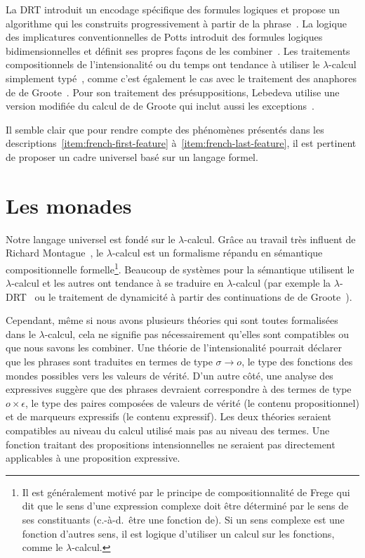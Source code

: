 La DRT introduit un encodage spécifique des formules logiques et propose un
algorithme qui les construits progressivement à partir de la phrase~\cite{kamp1993discourse}. La logique des implicatures conventionnelles de
Potts introduit des formules logiques bidimensionnelles et définit ses propres
façons de les combiner~\cite{potts2005logic}. Les traitements compositionnels
de l'intensionalité ou du temps ont tendance à utiliser le $\lambda$-calcul
simplement typé~\cite{ben2007semantics,de2013note}, comme c'est également le cas
avec le traitement des anaphores de de Groote~\cite{de2006towards}. Pour son traitement
des présuppositions, Lebedeva utilise une version modifiée du calcul de de Groote
qui inclut aussi les exceptions~\cite{lebedeva2012expression}.

Il semble clair que pour rendre compte des phénomènes présentés dans les descriptions~\ref{item:french-first-feature} à~\ref{item:french-last-feature}, il est pertinent de proposer un cadre universel basé sur un langage formel.

\section*{Les monades}

Notre langage universel est fondé sur le $\lambda$-calcul. Grâce au travail
très influent de Richard Montague~\cite{montague1973proper}, le $\lambda$-calcul
est un formalisme répandu en sémantique
compositionnelle formelle\footnote{Il est généralement motivé par le principe de compositionnalité de Frege qui
  dit que le sens d'une expression complexe doit être déterminé par le sens de ses constituants (c.-à-d.\
  être une fonction de). Si un sens complexe est une fonction d'autres sens, il est logique d'utiliser un calcul sur les
  fonctions, comme le $\lambda$-calcul.}. Beaucoup de systèmes pour la sémantique
utilisent le $\lambda$-calcul et les autres ont tendance à se 
traduire en $\lambda$-calcul (par exemple la $\lambda$-DRT~\cite{kuschert1995type} 
ou le traitement de dynamicité à partir
des continuations de de Groote~\cite{de2006towards}).

Cependant, même si nous avons plusieurs théories qui sont toutes formalisées
dans le $\lambda$-calcul, cela ne signifie pas nécessairement qu'elles sont
compatibles ou que nous savons les combiner. Une théorie de l'intensionalité
pourrait déclarer que les phrases sont traduites en termes de type
$\sigma \to o$, le type des fonctions des mondes possibles vers les valeurs de
vérité. D'un autre côté, une analyse des expressives suggère que des phrases
devraient correspondre à des termes de type $o \times \epsilon$, le type des
paires composées de valeurs de vérité (le contenu propositionnel) et de marqueurs
expressifs (le contenu expressif). Les deux théories seraient compatibles au
niveau du calcul utilisé mais pas au niveau des termes. Une fonction
traitant des propositions intensionnelles ne seraient pas directement
applicables à une proposition expressive.

